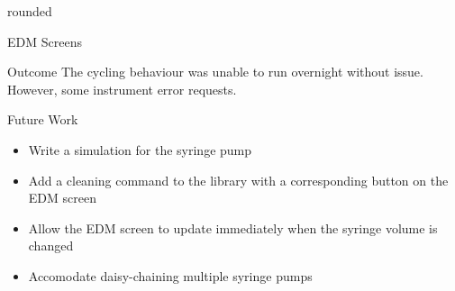 \documentclass[a0paper,landscape,fontscale=0.32]{baposter}
\begin{document}
\begin{poster}
\begin{posterbox}[name=edmimage,column=3,headerfont={},headershape=rounded,boxheaderheight=0em,boxColorOne=white,borderColor=white]{rounded}
\end{posterbox}
\begin{posterbox}[name=edmscreenexp,column=3,below=edmimage]{EDM Screens}
\end{posterbox}
\begin{posterbox}[name=outcome,column=3,below=edmscreenexp]{Outcome}
The cycling behaviour was unable to run overnight without issue. However, some instrument error requests.
\end{posterbox}
\begin{posterbox}[name=futurework,column=3,above=bottom]{Future Work}
 \begin{itemize}
    \item Write a simulation for the syringe pump
    \item Add a cleaning command to the library with a corresponding button on the EDM screen
    \item Allow the EDM screen to update immediately when the syringe volume is changed
    \item Accomodate daisy-chaining multiple syringe pumps
\end{itemize}
\end{posterbox}

\end{poster}
\end{document}
